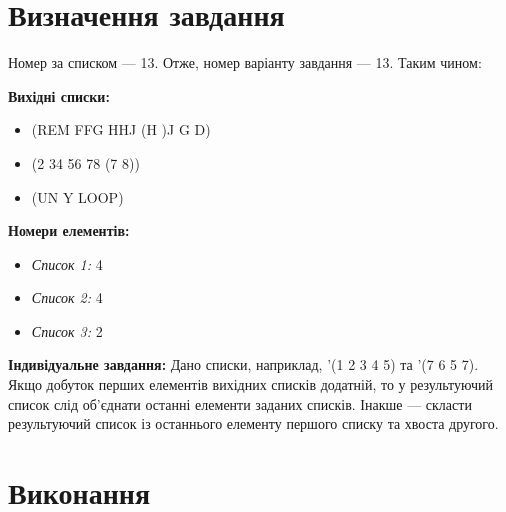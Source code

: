 \documentclass[a4paper, 12pt]{extarticle}
\begin{document}
\section{Визначення завдання}
Номер за списком --- 13. Отже, номер варіанту завдання --- 13.
Таким чином:

\textbf{Вихідні списки:}
\begin{itemize}
  \item (REM FFG HHJ (H )J G D)
  \item (2 34 56 78 (7 8))
  \item (UN Y LOOP)
\end{itemize}

\textbf{Номери елементів:}
\begin{itemize}
  \item \textit{Список 1:} 4
  \item \textit{Список 2:} 4
  \item \textit{Список 3:} 2
\end{itemize}

\textbf{Індивідуальне завдання:}
Дано списки, наприклад, '(1 2 3 4 5) та '(7 6 5 7). Якщо добуток перших елементів вихідних списків додатній, то у результуючий список слід об'єднати останні елементи заданих списків. Інакше --- скласти результуючий список із останнього елементу першого списку та хвоста другого.

\section{Виконання}





\end{document}
